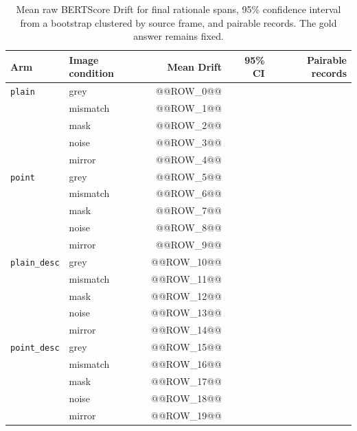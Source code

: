 \begin{table}[ht]
\centering
\caption[Stage~2 BERTScore Drift by image condition]{Mean raw BERTScore Drift
for final rationale spans, 95\% confidence interval from a bootstrap clustered
by source frame, and pairable records. The gold answer remains fixed.}
\label{tab:rq2-drift}
\begin{tabular}{llrrr}
\toprule
Arm & Image condition & Mean Drift & 95\% CI & Pairable records \\
\midrule
\texttt{plain} & grey & @@ROW_0@@ \\
 & mismatch & @@ROW_1@@ \\
 & mask & @@ROW_2@@ \\
 & noise & @@ROW_3@@ \\
 & mirror & @@ROW_4@@ \\
\texttt{point} & grey & @@ROW_5@@ \\
 & mismatch & @@ROW_6@@ \\
 & mask & @@ROW_7@@ \\
 & noise & @@ROW_8@@ \\
 & mirror & @@ROW_9@@ \\
\texttt{plain\_desc} & grey & @@ROW_10@@ \\
 & mismatch & @@ROW_11@@ \\
 & mask & @@ROW_12@@ \\
 & noise & @@ROW_13@@ \\
 & mirror & @@ROW_14@@ \\
\texttt{point\_desc} & grey & @@ROW_15@@ \\
 & mismatch & @@ROW_16@@ \\
 & mask & @@ROW_17@@ \\
 & noise & @@ROW_18@@ \\
 & mirror & @@ROW_19@@ \\
\bottomrule
\end{tabular}
\end{table}
